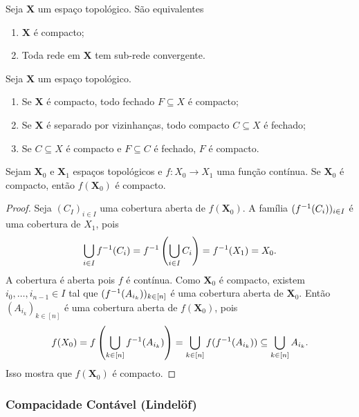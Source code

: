 \begin{prop}
Seja $\bm X$ um espaço topológico. São equivalentes
	\begin{enumerate}
	\item $\bm X$ é compacto;
	\item Toda rede em $\bm X$ tem sub-rede convergente.
	\end{enumerate}
\end{prop}

\begin{prop}
Seja $\bm X$ um espaço topológico.
	\begin{enumerate}
	\item Se $\bm X$ é compacto, todo fechado $F \subseteq X$ é compacto;
	\item Se $\bm X$ é separado por vizinhanças, todo compacto $C \subseteq X$ é fechado;
	\item Se $C \subseteq X$ é compacto e $F \subseteq C$ é fechado, $F$ é compacto.
	\end{enumerate}
\end{prop}

\begin{prop}
Sejam $\bm X_0$ e $\bm X_1$ espaços topológicos e $f: X_0 \to X_1$ uma função contínua. Se $\bm X_0$ é compacto, então $f(\bm X_0)$ é compacto.
\end{prop}
\begin{proof}
Seja $(C_I)_{i \in I}$ uma cobertura aberta de $f(\bm X_0)$. A família $(f^{-1}(C_i))_{i \in I}$ é  uma cobertura de $X_1$, pois
	\begin{equation*}
	\bigcup_{i \in I}f^{-1}(C_i) = f^{-1}\left(\bigcup_{i \in I}C_i\right) = f^{-1}(X_1) = X_0.
	\end{equation*}
A cobertura é aberta pois $f$ é contínua. Como $\bm X_0$ é compacto, existem $i_0, \ldots, i_{n-1} \in I$ tal que $(f^{-1}(A_{i_k}))_{k \in [n]}$ é uma cobertura aberta de $\bm X_0$. Então $(A_{i_k})_{k \in [n]}$ é uma cobertura aberta de $f(\bm X_0)$, pois
	\begin{equation*}
	f(X_0) = f\left(\bigcup_{k \in [n]} f ^{-1}(A_{i_k})\right) = \bigcup_{k \in [n]} f(f^{-1}(A_{i_k})) \subseteq  \bigcup_{k \in [n]} A_{i_k}.
	\end{equation*}
Isso mostra que $f(\bm X_0)$ é compacto.
\end{proof}

\subsubsection{Compacidade Contável (Lindelöf)}

